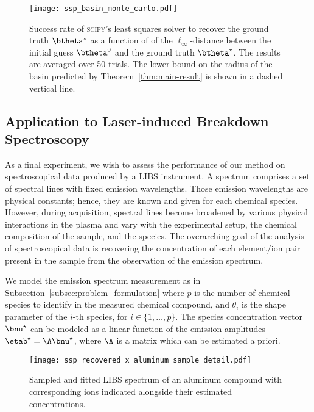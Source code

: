 \documentclass[conference,english,final,svgnames]{IEEEtran}
\begin{document}
\begin{figure}[t]
    \centering
    \texttt{[image: ssp\_basin\_monte\_carlo.pdf]}
    \vspace{-12pt}
    \caption{Success rate of \textsc{scipy}'s least squares solver to recover the ground truth $\btheta^\star$ as a function of of the $\ell_{\infty}$-distance between the initial guess $\btheta^{0}$ and the ground truth $\btheta^{\star}$. The results are averaged over 50 trials. The lower bound on the radius of the basin predicted by Theorem~\ref{thm:main-result} is shown in a dashed vertical line.}
    \label{fig:basins-monte-carlo}
\end{figure}

\subsection{Application to Laser-induced Breakdown Spectroscopy}

As a final experiment, we wish to assess the performance of our method on spectroscopical data produced by a LIBS instrument. A spectrum comprises a set of spectral lines with fixed emission wavelengths. Those emission wavelengths are physical constants; hence, they are known and given for each chemical species. However, during acquisition, spectral lines become broadened by various physical interactions in the plasma and vary with the experimental setup, the chemical composition of the sample, and the species. The overarching goal of the analysis of spectroscopical data is recovering the concentration of each element/ion pair present in the sample from the observation of the emission spectrum.

We model the emission spectrum measurement as in Subsection~\ref{subsec:problem_formulation} where $p$ is the number of chemical species to identify in the measured chemical compound, and $\theta_i$ is the shape parameter of the $i$-th species, for $i \in \{1, \dots, p\}$. The species concentration vector $\bnu^\star$ can be modeled as a linear function of the emission amplitudes
\(\etab^\star = \A \bnu^\star
\),
where $\A$ is a matrix which can be estimated a priori.

\begin{figure}[t]
    \centering
    \texttt{[image: ssp\_recovered\_x\_aluminum\_sample\_detail.pdf]}
    \vspace{-14pt}
    \caption{Sampled and fitted LIBS spectrum of an aluminum compound with corresponding ions indicated alongside their estimated concentrations.}
    \label{fig:libs-aluminum}
\end{figure}
\end{document}
